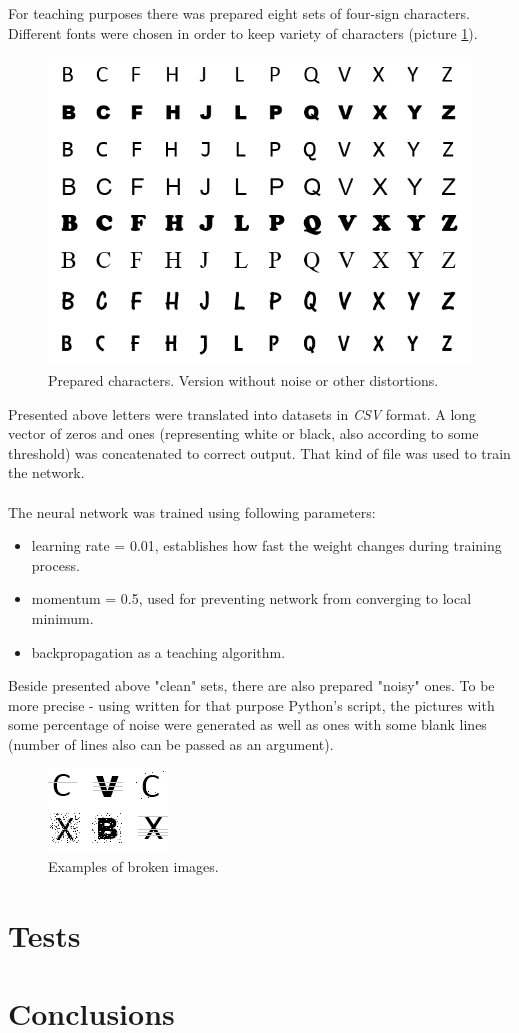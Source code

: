 \documentclass[eng,openany]{mgr}
\begin{document}
For teaching purposes there was prepared eight sets of four-sign characters. Different fonts were chosen in order to keep variety of characters (picture \ref{fig:alphabet}).
\begin{figure}[h]
\centering
\includegraphics[width=0.7\linewidth]{./alphabet}
\caption{Prepared characters. Version without noise or other distortions.}
\label{fig:alphabet}
\end{figure}
Presented above letters were translated into datasets in \textit{CSV} format. A long vector of zeros and ones (representing white or black, also according to some threshold) was concatenated to correct output. That kind of file was used to train the network.
\\
\\
The neural network was trained using following parameters:
\begin{itemize}
\item learning rate = 0.01, establishes how fast the weight changes during training process.
\item momentum = 0.5, used for preventing network from converging to local minimum.
\item backpropagation as a teaching algorithm.
\end{itemize}



Beside presented above "clean" sets, there are also prepared "noisy" ones. To be more precise - using written for that purpose Python's  script, the pictures with some percentage of noise were generated as well as ones with some blank lines (number of lines also can be passed as an argument).

\begin{figure}[h]
\centering
\includegraphics[width=0.3\linewidth]{./c}
\caption{Examples of broken images.}
\label{fig:c}
\end{figure}

\chapter{Tests}
\chapter{Conclusions}
\end{document}
